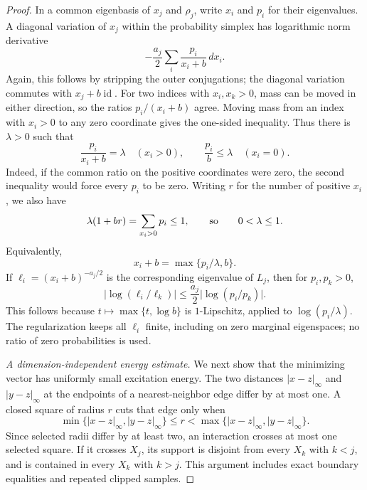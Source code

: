 \documentclass[11pt]{article}
\numberwithin{equation}{section}
\theoremstyle{definition}
\theoremstyle{remark}
\begin{document}
\begin{proof}
In a common eigenbasis of \(x_j\) and \(\rho_j\), write \(x_i\)
and \(p_i\) for their eigenvalues.  A diagonal variation of \(x_j\)
within the probability simplex has logarithmic norm derivative
\begin{equation}
 -\frac{a_j}{2}\sum_i \frac{p_i}{x_i+b}\,dx_i.
 \label{eq:patch-simplex-derivative}
\end{equation}
Again, this follows by stripping the outer conjugations; the
diagonal variation commutes with \(x_j+b\operatorname{id}\).
For two indices with \(x_i,x_k>0\), mass can be moved in either
direction, so the ratios \(p_i/(x_i+b)\) agree.  Moving mass from
an index with \(x_i>0\) to any zero coordinate gives the one-sided
inequality.  Thus there is \(\lambda>0\) such that
\begin{equation}
 \frac{p_i}{x_i+b}=\lambda\quad(x_i>0),
 \qquad
 \frac{p_i}{b}\leq\lambda\quad(x_i=0).
 \label{eq:patch-kkt}
\end{equation}
Indeed, if the common ratio on the positive coordinates were zero,
the second inequality would force every \(p_i\) to be zero.
Writing \(r\) for the number of positive \(x_i\), we also have
\[
 \lambda(1+br)=\sum_{x_i>0}p_i\leq1,
 \qquad\hbox{so}\qquad 0<\lambda\leq1.
\]
Equivalently,
\begin{equation}
 x_i+b=\max\{p_i/\lambda,b\}.
 \label{eq:patch-clipped-eigenvalues}
\end{equation}
If \(\ell_i=(x_i+b)^{-a_j/2}\) is the corresponding eigenvalue
of \(L_j\), then for \(p_i,p_k>0\),
\begin{equation}
 \lvert \log(\ell_i/\ell_k)\rvert
 \leq \frac{a_j}{2}\lvert \log(p_i/p_k)\rvert .
 \label{eq:patch-log-ratio}
\end{equation}
This follows because \(t\mapsto\max\{t,\log b\}\) is
\(1\)-Lipschitz, applied to \(\log(p_i/\lambda)\).
The regularization keeps all \(\ell_i\) finite, including on zero
marginal eigenspaces; no ratio of zero probabilities is used.

\emph{A dimension-independent energy estimate.}
We next show that the minimizing vector has uniformly small
excitation energy.  The two distances
\(\lvert x-z\rvert_\infty\) and \(\lvert y-z\rvert_\infty\) at the endpoints
of a nearest-neighbor edge differ by at most one.  A closed square
of radius \(r\) cuts that edge only when
\[
 \min\{\lvert x-z\rvert_\infty,\lvert y-z\rvert_\infty\}
       \leq r
       <\max\{\lvert x-z\rvert_\infty,\lvert y-z\rvert_\infty\}.
\]
Since selected radii differ by at least two, an interaction crosses
at most one selected square.  If it crosses \(X_j\), its support
is disjoint from every \(X_k\) with \(k<j\), and is contained in
every \(X_k\) with \(k>j\).  This argument includes exact boundary
equalities and repeated clipped samples.


\end{proof}
\end{document}
